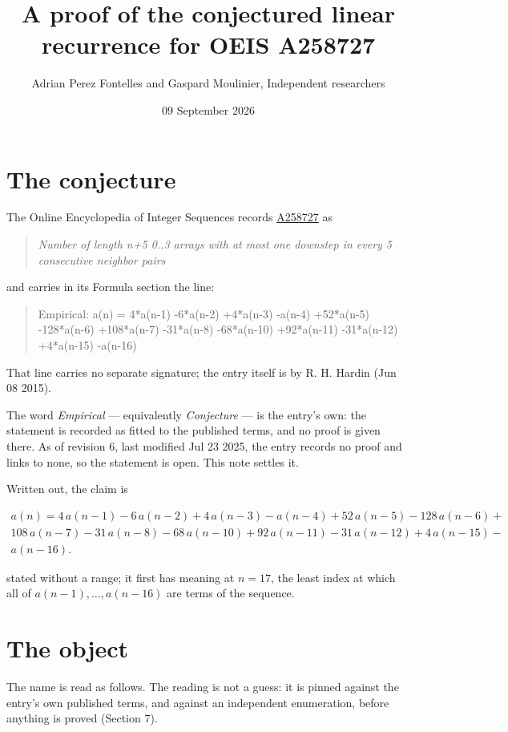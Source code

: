 \documentclass[11pt]{article}
\title{A proof of the conjectured linear recurrence for OEIS A258727}
\author{Adrian Perez Fontelles and Gaspard Moulinier, Independent researchers}
\date{09 September 2026}
\theoremstyle{definition}
\begin{document}
\maketitle
\section{The conjecture}

The Online Encyclopedia of Integer Sequences records \href{https://oeis.org/A258727}{A258727} as

\begin{quote}\itshape Number of length n+5 0..3 arrays with at most one downstep in every 5 consecutive neighbor pairs\end{quote}

and carries in its Formula section the line:

\begin{quote}\ttfamily Empirical: a(n) = 4*a(n-1) -6*a(n-2) +4*a(n-3) -a(n-4) +52*a(n-5) -128*a(n-6) +108*a(n-7) -31*a(n-8) -68*a(n-10) +92*a(n-11) -31*a(n-12) +4*a(n-15) -a(n-16)\end{quote}

That line carries no separate signature; the entry itself is by R. H. Hardin (Jun 08 2015).

The word {\itshape Empirical} --- equivalently {\itshape Conjecture} --- is the entry's own: the statement is recorded as fitted to the published terms, and no proof is given there. As of revision 6, last modified Jul 23 2025, the entry records no proof and links to none, so the statement is open. This note settles it.

Written out, the claim is

\begin{multline*} a(n) = 4\,a(n-1) - 6\,a(n-2) + 4\,a(n-3) - a(n-4) + 52\,a(n-5) - 128\,a(n-6) + \\ 108\,a(n-7) - 31\,a(n-8) - 68\,a(n-10) + 92\,a(n-11) - 31\,a(n-12) + 4\,a(n-15) - \\ a(n-16). \end{multline*}

stated without a range; it first has meaning at $n = 17$, the least index at which all of $a(n-1),\dots,a(n-16)$ are terms of the sequence.

\section{The object}

The name is read as follows. The reading is not a guess: it is pinned against the entry's own published terms, and against an independent enumeration, before anything is proved (Section 7).
\end{document}

